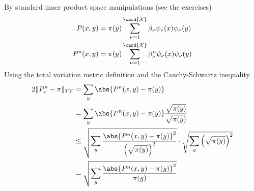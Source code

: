 \documentclass[12pt]{article}
\begin{document}
By standard inner product space manipulations (see the exercises)
\begin{align*}
    P(x,y) &= \pi(y) \sum\limits_{\nu=1}^{\card{\mathcal{X}}} \beta_\nu
    \psi_\nu (x) \psi_\nu(y) \\
    P^n(x,y) &= \pi(y) \sum\limits_{\nu=1}^{\card{\mathcal{X}}} \beta_\nu^n
    \psi_\nu(x) \psi_\nu(y) \\
\end{align*}
Using the total variation metric definition and the Cauchy-Schwartz
inequality
\begin{align*}
    2\|P^n_x - \pi\|_{TV} &= \sum\limits_y \abs{P^n(x,y) - \pi(y) } \\
    &= \sum\limits_y \abs{P^n(x,y) - \pi(y) } \frac{\sqrt{\pi(y)}}{\sqrt
    {\pi(y)}}\\
    &\le \sqrt{\sum_y \frac{\abs{P^n(x,y) - \pi(y) }^2}{\left( \sqrt{\pi
    (y)} \right)^2}} \cdot \sqrt{\sum_y \left( \sqrt{\pi(y)} \right)^2}
    \\
    &= \sqrt{\sum_y \frac{\abs{P^n(x,y) - \pi(y)}^2}{\pi(y)} }.
\end{align*}
\end{document}
